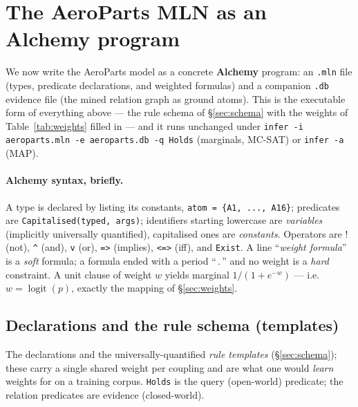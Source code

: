 \documentclass[11pt]{article}
\begin{document}
\section{The AeroParts MLN as an Alchemy program}
\label{sec:alchemy}

We now write the AeroParts model as a concrete \textbf{Alchemy} \citep{mln,alchemy} program:
an \texttt{.mln} file (types, predicate declarations, and weighted formulas) and a companion
\texttt{.db} evidence file (the mined relation graph as ground atoms). This is the executable
form of everything above --- the rule schema of \S\ref{sec:schema} with the weights of
Table~\ref{tab:weights} filled in --- and it runs unchanged under
\texttt{infer -i aeroparts.mln -e aeroparts.db -q Holds} (marginals, MC-SAT) or
\texttt{infer -a} (MAP).

\paragraph{Alchemy syntax, briefly.} A type is declared by listing its constants,
\lstinline[style=mln]!atom = {A1, ..., A16}!; predicates are \lstinline[style=mln]!Capitalised(typed, args)!;
identifiers starting lowercase are \emph{variables} (implicitly universally quantified),
capitalised ones are \emph{constants}. Operators are \verb!!! (not), \verb!^! (and),
\verb!v! (or), \verb!=>! (implies), \verb!<=>! (iff), and \verb!Exist!. A line
``\emph{weight formula}'' is a \emph{soft} formula; a formula ended with a period ``\,.\,''
and no weight is a \emph{hard} constraint. A unit clause of weight $w$ yields marginal
$1/(1+e^{-w})$ --- i.e.\ $w=\operatorname{logit}(p)$, exactly the mapping of
\S\ref{sec:weights}.

\subsection{Declarations and the rule schema (templates)}
The declarations and the universally-quantified \emph{rule templates}
(\S\ref{sec:schema}); these carry a single shared weight per coupling and are what one would
\emph{learn} weights for on a training corpus. \texttt{Holds} is the query (open-world)
predicate; the relation predicates are evidence (closed-world).
\end{document}
